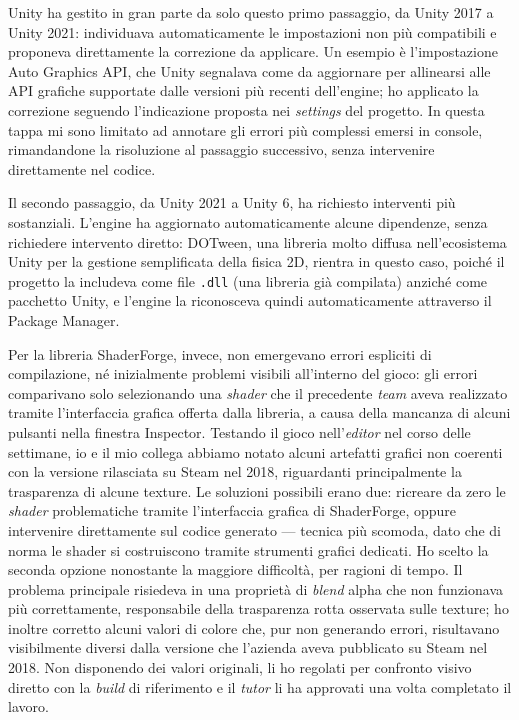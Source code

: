 Unity ha gestito in gran parte da solo questo primo passaggio, da Unity 2017 a Unity 2021: individuava automaticamente le impostazioni non più compatibili e proponeva direttamente la correzione da applicare. Un esempio è l'impostazione Auto Graphics API, che Unity segnalava come da aggiornare per allinearsi alle API grafiche supportate dalle versioni più recenti dell'engine; ho applicato la correzione seguendo l'indicazione proposta nei \textit{settings} del progetto. In questa tappa mi sono limitato ad annotare gli errori più complessi emersi in console, rimandandone la risoluzione al passaggio successivo, senza intervenire direttamente nel codice.
 
Il secondo passaggio, da Unity 2021 a Unity 6, ha richiesto interventi più sostanziali. L'engine ha aggiornato automaticamente alcune dipendenze, senza richiedere intervento diretto: DOTween, una libreria molto diffusa nell'ecosistema Unity per la gestione semplificata della fisica 2D, rientra in questo caso, poiché il progetto la includeva come file \texttt{.dll} (una libreria già compilata) anziché come pacchetto Unity, e l'engine la riconosceva quindi automaticamente attraverso il Package Manager.
 
Per la libreria ShaderForge, invece, non emergevano errori espliciti di compilazione, né inizialmente problemi visibili all'interno del gioco: gli errori comparivano solo selezionando una \textit{shader} che il precedente \textit{team} aveva realizzato tramite l'interfaccia grafica offerta dalla libreria, a causa della mancanza di alcuni pulsanti nella finestra Inspector. Testando il gioco nell'\textit{editor} nel corso delle settimane, io e il mio collega abbiamo notato alcuni artefatti grafici non coerenti con la versione rilasciata su Steam nel 2018, riguardanti principalmente la trasparenza di alcune texture. Le soluzioni possibili erano due: ricreare da zero le \textit{shader} problematiche tramite l'interfaccia grafica di ShaderForge, oppure intervenire direttamente sul codice generato — tecnica più scomoda, dato che di norma le shader si costruiscono tramite strumenti grafici dedicati. Ho scelto la seconda opzione nonostante la maggiore difficoltà, per ragioni di tempo. Il problema principale risiedeva in una proprietà di \textit{blend} alpha che non funzionava più correttamente, responsabile della trasparenza rotta osservata sulle texture; ho inoltre corretto alcuni valori di colore che, pur non generando errori, risultavano visibilmente diversi dalla versione che l'azienda aveva pubblicato su Steam nel 2018. Non disponendo dei valori originali, li ho regolati per confronto visivo diretto con la \textit{build} di riferimento e il \textit{tutor} li ha approvati una volta completato il lavoro.
 
